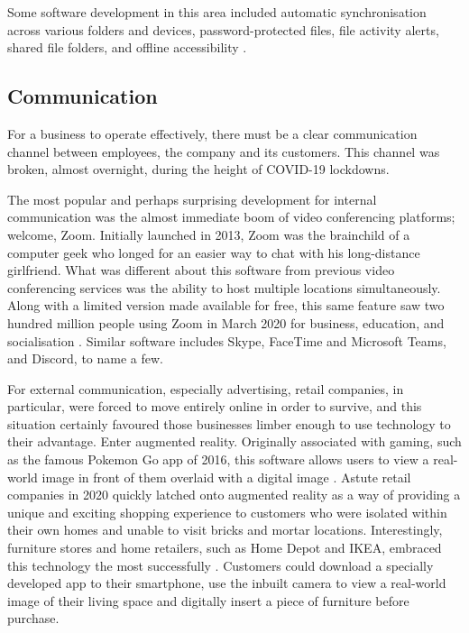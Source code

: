 \documentclass[12pt]{article}
\begin{document}
Some software development in this area included automatic synchronisation across various folders and devices, password-protected files, file activity alerts, shared file folders, and offline accessibility \cite{diamond}.

\subsection{Communication}
For a business to operate effectively, there must be a clear communication channel between employees, the company and its customers. This channel was broken, almost overnight, during the height of COVID-19 lockdowns. \par 

The most popular and perhaps surprising development for internal communication was the almost immediate boom of video conferencing platforms; welcome, Zoom. Initially launched in 2013, Zoom was the brainchild of a computer geek who longed for an easier way to chat with his long-distance girlfriend. What was different about this software from previous video conferencing services was the ability to host multiple locations simultaneously. Along with a limited version made available for free, this same feature saw two hundred million people using Zoom in March 2020 for business, education, and socialisation \cite{enssle}. Similar software includes Skype, FaceTime and Microsoft Teams, and Discord, to name a few. \par 

For external communication, especially advertising, retail companies, in particular, were forced to move entirely online in order to survive, and this situation certainly favoured those businesses limber enough to use technology to their advantage. Enter augmented reality. Originally associated with gaming, such as the famous Pokemon Go app of 2016, this software allows users to view a real-world image in front of them overlaid with a digital image \cite{franklin}. Astute retail companies in 2020 quickly latched onto augmented reality as a way of providing a unique and exciting shopping experience to customers who were isolated within their own homes and unable to visit bricks and mortar locations. Interestingly, furniture stores and home retailers, such as Home Depot and IKEA, embraced this technology the most successfully \cite{mckinnon}. Customers could download a specially developed app to their smartphone, use the inbuilt camera to view a real-world image of their living space and digitally insert a piece of furniture before purchase. \par 
\end{document}
